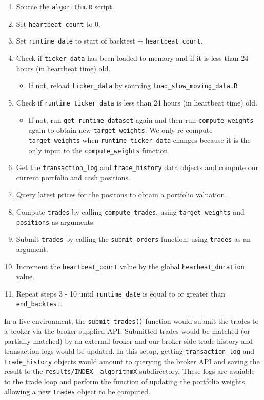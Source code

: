 \documentclass[11pt,preprint, authoryear]{elsarticle}
\numberwithin{equation}{section}
\numberwithin{figure}{section}
\numberwithin{table}{section}
\def\tightlist{} %
\begin{document}
\begin{enumerate}
\def\labelenumi{\arabic{enumi}.}
\tightlist
\item
  Source the \texttt{algorithm.R} script.
\item
  Set \texttt{heartbeat\_count} to 0.
\item
  Set \texttt{runtime\_date} to start of backtest +
  \texttt{heartbeat\_count}.
\item
  Check if \texttt{ticker\_data} has been loaded to memory and if it is
  less than 24 hours (in heartbeat time) old.

  \begin{itemize}
  \tightlist
  \item
    If not, reload \texttt{ticker\_data} by sourcing
    \texttt{load\_slow\_moving\_data.R}
  \end{itemize}
\item
  Check if \texttt{runtime\_ticker\_data} is less than 24 hours (in
  heartbeat time) old.

  \begin{itemize}
  \tightlist
  \item
    If not, run \texttt{get\_runtime\_dataset} again and then run
    \texttt{compute\_weights} again to obtain new
    \texttt{target\_weights}. We only re-compute
    \texttt{target\_weights} when \texttt{runtime\_ticker\_data} changes
    because it is the only input to the \texttt{compute\_weights}
    function.
  \end{itemize}
\item
  Get the \texttt{transaction\_log} and \texttt{trade\_history} data
  objects and compute our current portfolio and cash positions.
\item
  Query latest prices for the positons to obtain a portfolio valuation.
\item
  Compute \texttt{trades} by calling \texttt{compute\_trades}, using
  \texttt{target\_weights} and \texttt{positions} as arguments.
\item
  Submit \texttt{trades} by calling the \texttt{submit\_orders}
  function, using \texttt{trades} as an argument.
\item
  Increment the \texttt{heartbeat\_count} value by the global
  \texttt{hearbeat\_duration} value.
\item
  Repeat steps 3 - 10 until \texttt{runtime\_date} is equal to or
  greater than \texttt{end\_backtest}.
\end{enumerate}

In a live environment, the \texttt{submit\_trades()} function would
submit the trades to a broker via the broker-supplied API. Submitted
trades would be matched (or partially matched) by an external broker and
our broker-side trade history and transaction logs would be updated. In
this setup, getting \texttt{transaction\_log} and
\texttt{trade\_history} objects would amount to querying the broker API
and saving the result to the \texttt{results/INDEX\_\_algorithmX}
subdirectory. These logs are avaiable to the trade loop and perform the
function of updating the portfolio weights, allowing a new
\texttt{trades} object to be computed.
\end{document}
